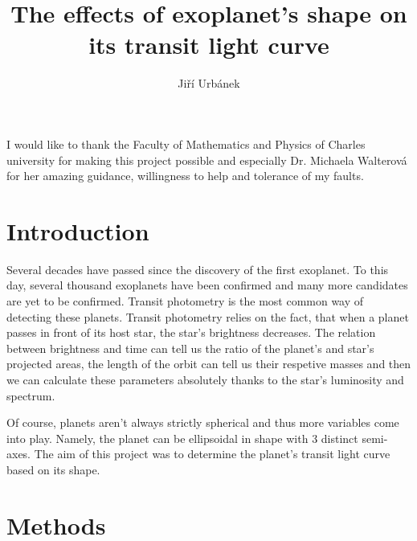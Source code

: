 \documentclass[10pt]{article}
\title{The effects of exoplanet's shape on its transit light curve}
\author{Jiří Urbánek}
\numberwithin{equation}{subsection}
\begin{document}
\maketitle
I would like to thank the Faculty of Mathematics and Physics of Charles university for
making this project possible and especially Dr. Michaela Walterová for her amazing
guidance, willingness to help and tolerance of my faults.
\section{Introduction}
Several decades have passed since the discovery of the first exoplanet. To this day,
several thousand exoplanets have been confirmed and many more candidates are yet to
be confirmed. Transit photometry is the most common way of detecting these planets.
Transit photometry relies on the fact, that when a planet passes in front of its host
star, the star's brightness decreases. The relation between brightness and time can tell
us the ratio of the planet's and star's projected areas, the length of the orbit can tell
us their respetive masses and then we can calculate these parameters absolutely thanks to
the star's luminosity and spectrum.

Of course, planets aren't always strictly spherical and thus more variables come into play.
Namely, the planet can be ellipsoidal in shape with 3 distinct semi-axes. The aim of this
project was to determine the planet's transit light curve based on its shape.
\section{Methods}
\end{document}
